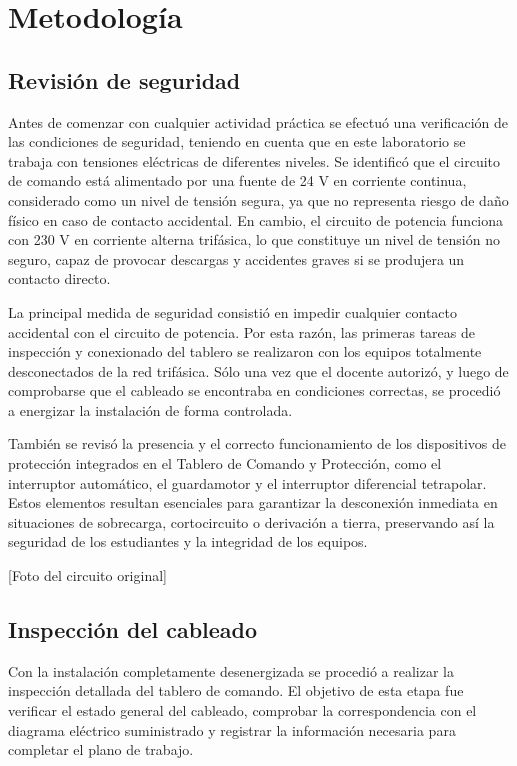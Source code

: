 \section{Metodología}
\subsection{Revisión de seguridad}

Antes de comenzar con cualquier actividad práctica se efectuó una verificación de las condiciones de seguridad, teniendo en cuenta que en este laboratorio se trabaja con tensiones eléctricas de diferentes niveles. Se identificó que el circuito de comando está alimentado por una fuente de 24 V en corriente continua, considerado como un nivel de tensión segura, ya que no representa riesgo de daño físico en caso de contacto accidental. En cambio, el circuito de potencia funciona con 230 V en corriente alterna trifásica, lo que constituye un nivel de tensión no seguro, capaz de provocar descargas y accidentes graves si se produjera un contacto directo.  

La principal medida de seguridad consistió en impedir cualquier contacto accidental con el circuito de potencia. Por esta razón, las primeras tareas de inspección y conexionado del tablero se realizaron con los equipos totalmente desconectados de la red trifásica. Sólo una vez que el docente autorizó, y luego de comprobarse que el cableado se encontraba en condiciones correctas, se procedió a energizar la instalación de forma controlada.  

También se revisó la presencia y el correcto funcionamiento de los dispositivos de protección integrados en el Tablero de Comando y Protección, como el interruptor automático, el guardamotor y el interruptor diferencial tetrapolar. Estos elementos resultan esenciales para garantizar la desconexión inmediata en situaciones de sobrecarga, cortocircuito o derivación a tierra, preservando así la seguridad de los estudiantes y la integridad de los equipos.

[Foto del circuito original]

\subsection{Inspección del cableado}

Con la instalación completamente desenergizada se procedió a realizar la inspección detallada del tablero de comando. El objetivo de esta etapa fue verificar el estado general del cableado, comprobar la correspondencia con el diagrama eléctrico suministrado y registrar la información necesaria para completar el plano de trabajo.  

